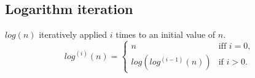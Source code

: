     \subsection{Logarithm iteration}
        \begin{definition}
            $log(n)$ iteratively applied $i$ times to an initial value of $n$.
            \begin{equation}
                log^{(i)}(n) = 
                \begin{cases}
                    n & \text{iff } i = 0, \\
                    log\left(log^{(i-1)}(n)\right) & \text{if } i > 0.
                \end{cases}
            \end{equation}
        \end{definition}
        

